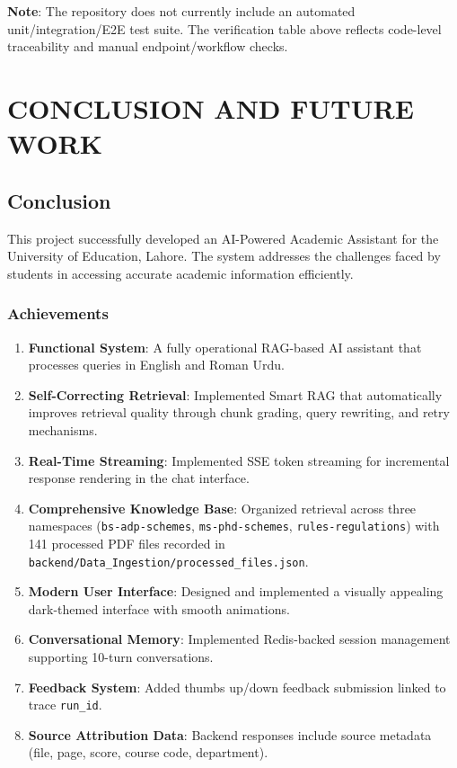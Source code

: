 \documentclass[12pt,a4paper]{book}
\numberwithin{table}{chapter}
\numberwithin{figure}{chapter}
\numberwithin{equation}{chapter}
\begin{document}
\bigskip
\textbf{Note}: The repository does not currently include an automated unit/integration/E2E test suite. The verification table above reflects code-level traceability and manual endpoint/workflow checks.

\clearpage

\chapter{CONCLUSION AND FUTURE WORK}

\section{Conclusion}

This project successfully developed an AI-Powered Academic Assistant for the University of Education, Lahore. The system addresses the challenges faced by students in accessing accurate academic information efficiently.

\subsection{Achievements}

\begin{enumerate}
    \item \textbf{Functional System}: A fully operational RAG-based AI assistant that processes queries in English and Roman Urdu.

    \item \textbf{Self-Correcting Retrieval}: Implemented Smart RAG that automatically improves retrieval quality through chunk grading, query rewriting, and retry mechanisms.

    \item \textbf{Real-Time Streaming}: Implemented SSE token streaming for incremental response rendering in the chat interface.

    \item \textbf{Comprehensive Knowledge Base}: Organized retrieval across three namespaces (\texttt{bs-adp-schemes}, \texttt{ms-phd-schemes}, \texttt{rules-regulations}) with 141 processed PDF files recorded in \texttt{backend/Data\_Ingestion/processed\_files.json}.

    \item \textbf{Modern User Interface}: Designed and implemented a visually appealing dark-themed interface with smooth animations.

    \item \textbf{Conversational Memory}: Implemented Redis-backed session management supporting 10-turn conversations.

    \item \textbf{Feedback System}: Added thumbs up/down feedback submission linked to trace \texttt{run\_id}.

    \item \textbf{Source Attribution Data}: Backend responses include source metadata (file, page, score, course code, department).
\end{enumerate}
\end{document}
